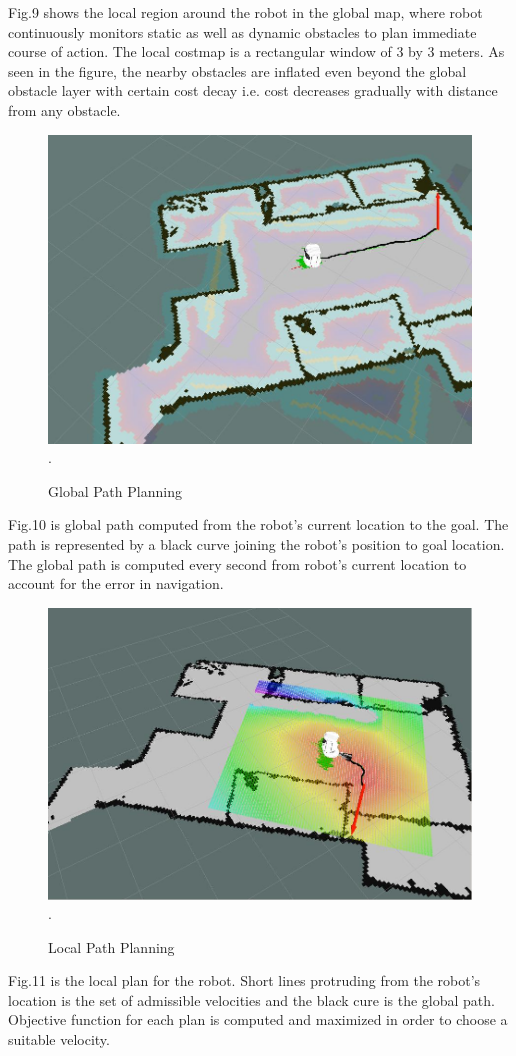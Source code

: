 \documentclass[journal,twoside]{IEEEtran}
\begin{document}
\par\noindent Fig.9 shows the local region around the robot in the global map, where robot continuously monitors static as well as dynamic obstacles to plan immediate course of action. The local costmap is a rectangular window of 3 by 3 meters. As seen in the figure, the nearby obstacles are inflated even beyond the global obstacle layer with certain cost decay i.e. cost decreases gradually with distance from any obstacle.
\begin{figure}[h]
\centering
\includegraphics[scale=.27]{10.jpg}
\DeclareGraphicsExtensions.
\caption{Global Path Planning}
\end{figure}
\par\noindent Fig.10 is global path computed from the robot’s current location to the goal. The path is represented by a black curve joining the robot’s position to goal location. The global path is computed every second from robot’s current location to account for the error in navigation.  
\begin{figure}[h]
\centering
\includegraphics[scale=.27]{11.jpg}
\DeclareGraphicsExtensions.
\caption{Local Path Planning}
\end{figure}
\par\noindent Fig.11 is the local plan for the robot. Short lines protruding from the robot’s location is the set of admissible velocities and the black cure is the global path. Objective function for each plan is computed and maximized in order to choose a suitable velocity.
\end{document}
